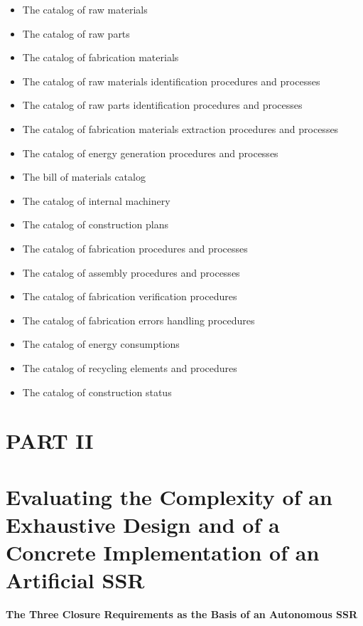\documentclass[letterpaper]{article}
\begin{document}
\begin{itemize}
\item The catalog of raw materials
\item The catalog of raw parts
\item The catalog of fabrication materials
\item The catalog of raw materials identification procedures and
processes
\item The catalog of raw parts identification procedures and processes
\item The catalog of fabrication materials extraction procedures and
processes
\item The catalog of energy generation procedures and processes
\item The bill of materials catalog
\item The catalog of internal machinery
\item The catalog of construction plans
\item The catalog of fabrication procedures and processes
\item The catalog of assembly procedures and processes
\item The catalog of fabrication verification procedures
\item The catalog of fabrication errors handling procedures
\item The catalog of energy consumptions
\item The catalog of recycling elements and procedures
\item The catalog of construction status
\end{itemize}

\bigskip

\clearpage\section[PART II]{PART II}
\hypertarget{RefHeading3112306210128}{}\section[Evaluating the
Complexity of an Exhaustive Design and of a Concrete Implementation of
an Artificial SSR]{Evaluating the Complexity of an Exhaustive Design
and of a Concrete Implementation of an Artificial SSR}
\hypertarget{RefHeading3114306210128}{}
\bigskip

{\bfseries
\hypertarget{RefHeading3116306210128}{}The Three Closure Requirements as
the Basis of an Autonomous SSR}
\end{document}
